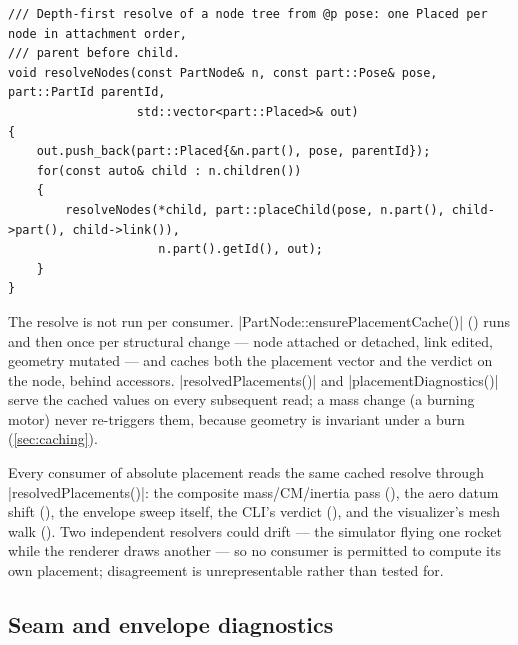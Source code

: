 \begin{listing}[htbp]
\begin{verbatim}
/// Depth-first resolve of a node tree from @p pose: one Placed per node in attachment order,
/// parent before child.
void resolveNodes(const PartNode& n, const part::Pose& pose, part::PartId parentId,
                  std::vector<part::Placed>& out)
{
    out.push_back(part::Placed{&n.part(), pose, parentId});
    for(const auto& child : n.children())
    {
        resolveNodes(*child, part::placeChild(pose, n.part(), child->part(), child->link()),
                     n.part().getId(), out);
    }
}
\end{verbatim}
\caption{The node-tree resolver (). The tree walk is ten
lines because all geometry lives in ; planting the root at the local origin makes
\emph{any} node a valid sub-assembly root for the composite queries.}\label{lst:placement-resolvenodes}
\end{listing}

The resolve is not run per consumer. \cppinline|PartNode::ensurePlacementCache()|
() runs  and then  once
per structural change --- node attached or detached, link edited, geometry mutated --- and caches
both the placement vector and the verdict on the node,  behind 
accessors. \cppinline|resolvedPlacements()| and \cppinline|placementDiagnostics()| serve the cached
values on every subsequent read; a mass change (a burning motor) never re-triggers them, because
geometry is invariant under a burn (\cref{sec:caching}).

\begin{designrule}
Every consumer of absolute placement reads the same cached resolve through
\cppinline|resolvedPlacements()|: the composite mass/CM/inertia pass
(), the aero datum shift
(), the envelope sweep itself, the CLI's 
verdict (), and the visualizer's mesh walk
(). Two independent resolvers could drift --- the simulator
flying one rocket while the renderer draws another --- so no consumer is permitted to compute its
own placement; disagreement is unrepresentable rather than tested for.
\end{designrule}

\subsection{Seam and envelope diagnostics}\label{sec:placement-diagnostics}

